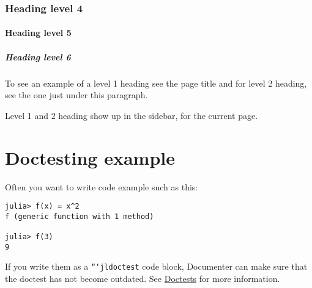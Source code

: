 \label{13085847155693612023}{}


\subsubsection{Heading level 4}



\label{12782044777122551513}{}


\paragraph{Heading level 5}\indent



\label{9543099701887315540}{}


\subparagraph{Heading level 6}\indent



\label{10897944457118690625}{}


To see an example of a level 1 heading see the page title and for level 2 heading, see the one just under this paragraph.



\begin{tcolorbox}[toptitle=-1mm,bottomtitle=1mm,colback=admonition-note!50!white,colframe=admonition-note,title=\textbf{Headings in sidebars}]
Level 1 and 2 heading show up in the sidebar, for the current page.

\end{tcolorbox}


\section{Doctesting example}



\label{10597583416623881668}{}


Often you want to write code example such as this:




\begin{verbatim}
julia> f(x) = x^2
f (generic function with 1 method)

julia> f(3)
9
\end{verbatim}



If you write them as a \texttt{```jldoctest} code block, Documenter can make sure that the doctest has not become outdated. See \href{@ref}{Doctests} for more information.



